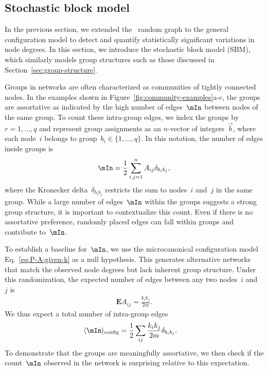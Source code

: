 \subsection{Stochastic block model}
\label{sec:SBM}
In the previous section, we extended the \ER~random graph to the general configuration model to detect and quantify statistically significant variations in node degrees. In this section, we introduce the stochastic block model (SBM), which similarly models group structures such as those discussed in Section~\ref{sec:group-structure}.

Groups in networks are often characterized as communities of tightly connected nodes. In the examples shown in Figure~\ref{fig:community-examples}a-c, the groups are assortative as indicated by the high number of edges~$\mIn$ between nodes of the same group. To count these intra-group edges, we index the groups by~$r = 1,...,q$ and represent group assignments as an $n$-vector of integers~$\vec{b}$, where each node~$i$ belongs to group~$b_i \in \{1,...,q\}$. In this notation, the number of edges inside groups is \begin{align}
    \mIn = \frac{1}{2} \sum_{i,j=1}^n A_{ij} \delta_{b_ib_j},
\end{align}
where the Kronecker delta~$\delta_{b_ib_j}$ restricts the sum to nodes~$i$ and~$j$ in the same group. While a large number of edges~$\mIn$ within the groups suggests a strong group structure, it is important to contextualize this count. Even if there is no assortative preference, randomly placed edges can fall within groups and contribute to~$\mIn$. 

To establish a baseline for~$\mIn$, we use the microcanonical configuration model Eq.~\eqref{eq:P-A-given-k} as a null hypothesis. This generates alternative networks that match the observed node degrees but lack inherent group structure. Under this randomization, the expected number of edges between any two nodes~$i$ and~$j$ is \begin{align}
    \mathbf{E} A_{ij} = \frac{k_i k_j}{2m}.
\end{align}
We thus expect a total number of intra-group edges \begin{align}
    \langle \mIn \rangle_{\text{config}} &= \frac{1}{2}\sum_{ij} \frac{k_ik_j}{2m} \delta_{b_ib_j}.
\end{align}
To demonstrate that the groups are meaningfully assortative, we then check if the count~$\mIn$ observed in the network is surprising relative to this expectation.

